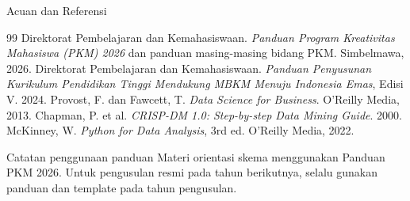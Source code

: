 \documentclass[aspectratio=169,11pt]{beamer}
\begin{document}
\begin{frame}{Acuan dan Referensi}
\scriptsize
\begin{thebibliography}{99}
 Direktorat Pembelajaran dan Kemahasiswaan. \textit{Panduan Program Kreativitas Mahasiswa (PKM) 2026} dan panduan masing-masing bidang PKM. Simbelmawa, 2026.
 Direktorat Pembelajaran dan Kemahasiswaan. \textit{Panduan Penyusunan Kurikulum Pendidikan Tinggi Mendukung MBKM Menuju Indonesia Emas}, Edisi V. 2024.
 Provost, F. dan Fawcett, T. \textit{Data Science for Business}. O'Reilly Media, 2013.
 Chapman, P. et al. \textit{CRISP-DM 1.0: Step-by-step Data Mining Guide}. 2000.
 McKinney, W. \textit{Python for Data Analysis}, 3rd ed. O'Reilly Media, 2022.
\end{thebibliography}

\vspace{2mm}
\begin{block}{Catatan penggunaan panduan}
\footnotesize
Materi orientasi skema menggunakan Panduan PKM 2026. Untuk pengusulan resmi pada tahun berikutnya, selalu gunakan panduan dan template pada tahun pengusulan.
\end{block}
\end{frame}
\end{document}
